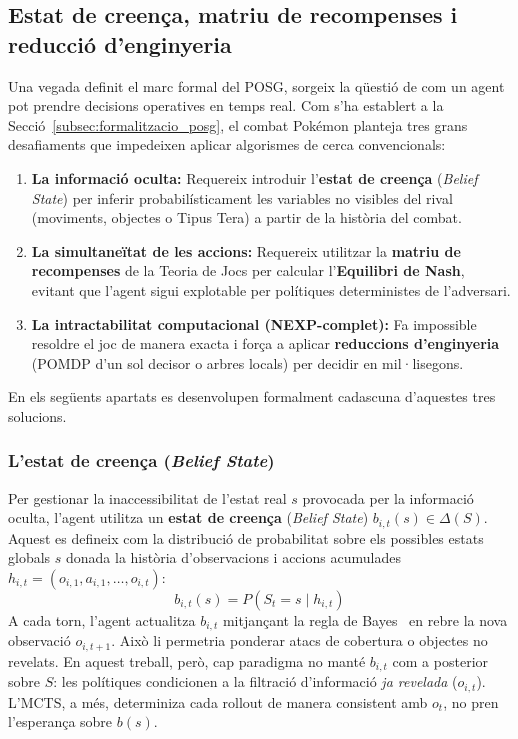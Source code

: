 \subsection{Estat de creença, matriu de recompenses i reducció d'enginyeria}
\label{subsec:creenca_recompenses_reduccio}

Una vegada definit el marc formal del POSG, sorgeix la qüestió de com un agent pot prendre decisions operatives en temps real. Com s'ha establert a la Secció~\ref{subsec:formalitzacio_posg}, el combat Pokémon planteja tres grans desafiaments que impedeixen aplicar algorismes de cerca convencionals:
\begin{enumerate}
    \item \textbf{La informació oculta:} Requereix introduir l'\textbf{estat de creença} (\emph{Belief State}) per inferir probabilísticament les variables no visibles del rival (moviments, objectes o Tipus Tera) a partir de la història del combat.
    \item \textbf{La simultaneïtat de les accions:} Requereix utilitzar la \textbf{matriu de recompenses} de la Teoria de Jocs per calcular l'\textbf{Equilibri de Nash}, evitant que l'agent sigui explotable per polítiques deterministes de l'adversari.
    \item \textbf{La intractabilitat computacional (NEXP-complet):} Fa impossible resoldre el joc de manera exacta i força a aplicar \textbf{reduccions d'enginyeria} (POMDP d'un sol decisor o arbres locals) per decidir en mil·lisegons.
\end{enumerate}
En els següents apartats es desenvolupen formalment cadascuna d'aquestes tres solucions.

\subsubsection{L'estat de creença (\emph{Belief State})}

Per gestionar la inaccessibilitat de l'estat real $s$ provocada per la informació oculta, l'agent utilitza un \textbf{estat de creença} (\emph{Belief State}) $b_{i,t}(s) \in \Delta(S)$. Aquest es defineix com la distribució de probabilitat sobre els possibles estats globals $s$ donada la història d'observacions i accions acumulades $h_{i,t} = (o_{i,1}, a_{i,1}, \dots, o_{i,t})$:
\begin{equation}
    b_{i,t}(s) = P(S_t = s \mid h_{i,t})
    \label{eq:belief_state}
\end{equation}
A cada torn, l'agent actualitza $b_{i,t}$ mitjançant la regla de Bayes~\cite{bayes_essay_1763} en rebre la nova observació $o_{i,t+1}$. Això li permetria ponderar atacs de cobertura o objectes no revelats. En aquest treball, però, cap paradigma no manté $b_{i,t}$ com a posterior sobre $S$: les polítiques condicionen a la filtració d'informació \emph{ja revelada} ($o_{i,t}$). L'MCTS, a més, determiniza cada rollout de manera consistent amb $o_t$, no pren l'esperança sobre $b(s)$.

